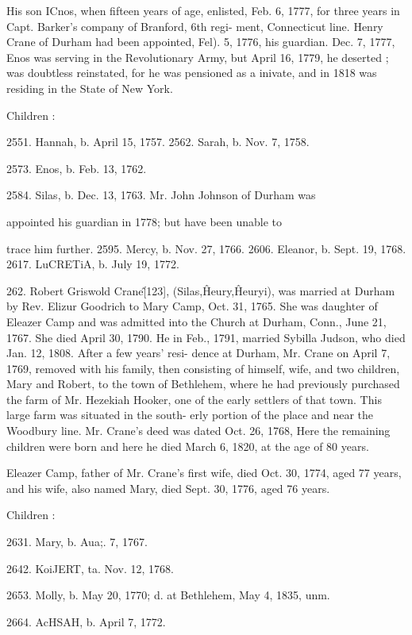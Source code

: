 His son ICnos, when fifteen years of age, enlisted, Feb. 6, 1777, 
for three years in Capt. Barker's company of Branford, 6th regi- 
ment, Connecticut line. Henry Crane of Durham had been 
appointed, Fel). 5, 1776, his guardian. Dec. 7, 1777, Enos was 
serving in the Revolutionary Army, but April 16, 1779, he 
deserted ; was doubtless reinstated, for he was pensioned as a 
inivate, and in 1818 was residing in the State of New York. 

Children : 

2551. Hannah, b. April 15, 1757. 
2562. Sarah, b. Nov. 7, 1758. 




2573. Enos, b. Feb. 13, 1762. 

2584. Silas, b. Dec. 13, 1763. Mr. John Johnson of Durham was 

appointed his guardian in 1778; but have been unable to 

trace him further. 
2595. Mercy, b. Nov. 27, 1766. 
2606. Eleanor, b. Sept. 19, 1768. 
2617. LuCRETiA, b. July 19, 1772. 

262. Robert Griswold Crane\^ [123], (Silas,\^ Heury,\^ 
Heuryi), was married at Durham by Rev. Elizur Goodrich to 
Mary Camp, Oct. 31, 1765. She was daughter of Eleazer Camp 
and was admitted into the Church at Durham, Conn., June 21, 
1767. She died April 30, 1790. He in Feb., 1791, married 
Sybilla Judson, who died Jan. 12, 1808. After a few years' resi- 
dence at Durham, Mr. Crane on April 7, 1769, removed with his 
family, then consisting of himself, wife, and two children, Mary 
and Robert, to the town of Bethlehem, where he had previously 
purchased the farm of Mr. Hezekiah Hooker, one of the early 
settlers of that town. This large farm was situated in the south- 
erly portion of the place and near the Woodbury line. Mr. 
Crane's deed was dated Oct. 26, 1768, Here the remaining 
children were born and here he died March 6, 1820, at the age 
of 80 years. 

Eleazer Camp, father of Mr. Crane's first wife, died Oct. 30, 
1774, aged 77 years, and his wife, also named Mary, died Sept. 
30, 1776, aged 76 years. 

Children : 

2631. Mary, b. Aua;. 7, 1767. 

2642. KoiJERT, ta. Nov. 12, 1768. 

2653. Molly, b. May 20, 1770; d. at Bethlehem, May 4, 1835, unm. 

2664. AcHSAH, b. April 7, 1772. 

